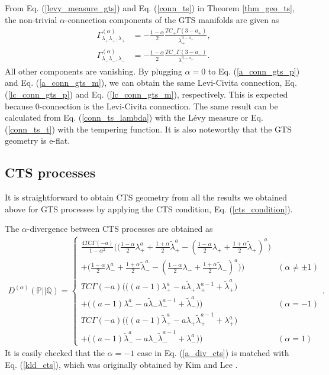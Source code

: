 \documentclass[preprint,11pt]{amsart}
\begin{document}
	From Eq. (\ref{levy_measure_gts}) and Eq. (\ref{conn_ts}) in Theorem \ref{thm_geo_ts}, the non-trivial $\alpha$-connection components of the GTS manifolds are given as
	\begin{align}
	\label{a_conn_gts_p}
	\Gamma^{(\alpha)}_{\lambda_+\lambda_+,\lambda_+}&=
	-\frac{1-\alpha}{2}\frac{TC_+\Gamma(3-a_+)}{ \lambda_+^{3-a_+}},\\
	\label{a_conn_gts_m}
	\Gamma^{(\alpha)}_{\lambda_-\lambda_-,\lambda_-}&=
	-\frac{1-\alpha}{2}\frac{TC_-\Gamma(3-a_-)}{ \lambda_-^{3-a_-}}.
	\end{align}
	All other components are vanishing. By plugging $\alpha=0$ to Eq. (\ref{a_conn_gts_p}) and Eq. (\ref{a_conn_gts_m}), we can obtain the same Levi-Civita connection, Eq. (\ref{lc_conn_gts_p}) and Eq. (\ref{lc_conn_gts_m}), respectively. This is expected because $0$-connection is the Levi-Civita connection. The same result can be calculated from Eq. (\ref{conn_ts_lambda}) with the L\'evy measure or Eq. (\ref{conn_ts_t}) with the tempering function. It is also noteworthy that the GTS geometry is e-flat.
	
	
\subsection{CTS processes}
	It is straightforward to obtain CTS geometry from all the results we obtained above for GTS processes by applying the CTS condition, Eq. (\ref{cts_condition}). 
	
	The $\alpha$-divergence between CTS processes are obtained as
	\begin{align}
	\label{a_div_cts}
	D^{(\alpha )}(\mathbb{P}||\mathbb{Q})=\left\{ 
	\begin{array}{ll}
	\frac{4TC\Gamma(-a)}{1-\alpha^2}\Big(\big( \frac{1-\alpha}{2} \lambda_+^{a}+\frac{1+\alpha}{2} \tilde{\lambda}_+^{a}-( \frac{1-\alpha}{2} \lambda_++\frac{1+\alpha}{2} \tilde{\lambda}_+)^{a}\big)\\
	+\big( \frac{1-\alpha}{2} \lambda_-^{a}+\frac{1+\alpha}{2} \tilde{\lambda}_-^{a}-( \frac{1-\alpha}{2} \lambda_-+\frac{1+\alpha}{2} \tilde{\lambda}_-)^{a}\big)\Big) & (\alpha \neq \pm 1)\\ 
	TC\Gamma(-a)\Big(\big((a-1)\lambda_+^{a}-a\tilde{\lambda}_+\lambda_+^{a-1}+\tilde{\lambda}_+^{a}\big)\\
	+\big((a-1)\lambda_-^{a}-a\tilde{\lambda}_-\lambda_-^{a-1}+\tilde{\lambda}_-^{a}\big)\Big) & (\alpha =-1)\\
	TC\Gamma(-a)\Big(\big((a-1)\tilde{\lambda}_+^{a}-a\lambda_+\tilde{\lambda}_+^{a-1}+\lambda_+^{a}\big)\\
	+\big((a-1)\tilde{\lambda}_-^{a}-a\lambda_-\tilde{\lambda}_-^{a-1}+\lambda_-^{a}\big)\Big) & (\alpha =1)
	\end{array}
	\right..
	\end{align}
	It is easily checked that the $\alpha=-1$ case in Eq. (\ref{a_div_cts}) is matched with Eq. (\ref{kld_cts}), which was originally obtained by Kim and Lee \cite{kim2007relative}.
	
\end{document}

